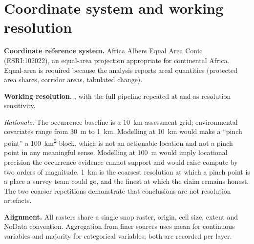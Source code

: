 \section{Coordinate system and working resolution}

\textbf{Coordinate reference system.} Africa Albers Equal Area Conic
(ESRI:102022), an equal-area projection appropriate for continental Africa.
Equal-area is required because the analysis reports areal quantities (protected
area shares, corridor areas, tabulated change).


\begin{center}
\end{center}

\textbf{Working resolution.} , with the full pipeline
repeated at  and  as
resolution sensitivity.

\emph{Rationale.} The occurrence baseline is a \SI{10}{\kilo\metre} assessment
grid; environmental covariates range from \SI{30}{\metre} to \SI{1}{\kilo\metre}.
Modelling at \SI{10}{\kilo\metre} would make a ``pinch point'' a
\SI{100}{\kilo\metre\squared} block, which is not an actionable location and not
a pinch point in any meaningful sense. Modelling at \SI{100}{\metre} would imply
locational precision the occurrence evidence cannot support and would raise
compute by two orders of magnitude. \SI{1}{\kilo\metre} is the coarsest
resolution at which a pinch point is a place a survey team could go, and the
finest at which the claim remains honest. The two coarser repetitions
demonstrate that conclusions are not resolution artefacts.

\textbf{Alignment.} All rasters share a single snap raster, origin, cell size,
extent and NoData convention. Aggregation from finer sources uses mean for
continuous variables and majority for categorical variables; both are recorded
per layer.

